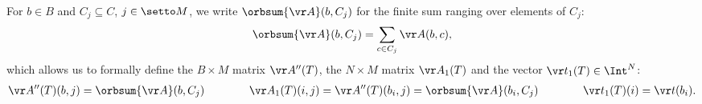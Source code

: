 
\noindent
For $b\in B$ and $C_j \subseteq C$, $j \in \setto M$, 
we write $\orbsum {\vr A}(b, C_j)$ for the finite sum ranging over elements of $C_j$:
\[
\orbsum {\vr A}(b, C_j) = \sum_{c\in C_j} \vr A(b,c),
\]
%
which allows us to formally define the $B{\times} M$ matrix $\vr A''(T)$, 
the $N{\times}M$ matrix $\vr A_1(T)$ and the vector $\vr t_1(T) \in \Int^N$:
\begin{align} \label{eq:defAt}
\vr A''(T) (b, j) = \orbsum {\vr A}(b, C_j) 
\qquad\qquad
\vr A_1(T) (i, j) = \vr A''(T)(b_i, j) = \orbsum {\vr A}(b_i, C_j) 
\qquad\qquad
\vr t_1(T) (i) = \vr t(b_i).
\end{align}

